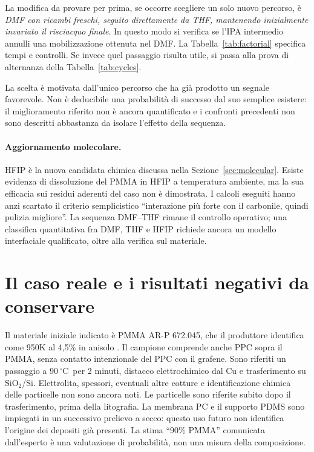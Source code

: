 \documentclass[11pt,reqno]{amsart}
\numberwithin{equation}{section}
\newcommand{\SiO}{\ensuremath{\mathrm{SiO}_2}}
\newcommand{\degC}{\ensuremath{^{\circ}\mathrm{C}}}
\begin{document}
La modifica da provare per prima, se occorre scegliere un solo
nuovo percorso, \`e \emph{DMF con ricambi freschi, seguito direttamente
da THF, mantenendo inizialmente invariato il risciacquo finale}.
In questo modo si verifica se l'IPA intermedio annulli una
mobilizzazione ottenuta nel DMF. La Tabella~\ref{tab:factorial}
specifica tempi e controlli. Se invece quel passaggio risulta utile,
si passa alla prova di alternanza della Tabella~\ref{tab:cycles}.

La scelta \`e motivata dall'unico percorso che ha gi\`a prodotto un
segnale favorevole. Non \`e deducibile una probabilit\`a di successo
dal suo semplice esistere: il miglioramento riferito non \`e ancora
quantificato e i confronti precedenti non sono descritti abbastanza
da isolare l'effetto della sequenza.


\paragraph{Aggiornamento molecolare.}
HFIP \`e la nuova candidata chimica discussa nella Sezione~\ref{sec:molecular}.
Esiste evidenza di dissoluzione del PMMA in HFIP a temperatura ambiente,
ma la sua efficacia sui residui aderenti del caso non \`e dimostrata.
I calcoli eseguiti hanno anzi scartato il criterio semplicistico
``interazione pi\`u forte con il carbonile, quindi pulizia migliore''.
La sequenza DMF--THF rimane il controllo operativo; una classifica
quantitativa fra DMF, THF e HFIP richiede ancora un modello interfaciale
qualificato, oltre alla verifica sul materiale.

\section{Il caso reale e i risultati negativi da conservare}

Il materiale iniziale indicato \`e PMMA AR-P 672.045, che il produttore
identifica come 950K al 4,5\% in anisolo \cite{Allresist}. Il campione
comprende anche PPC sopra il PMMA, senza contatto intenzionale del
PPC con il grafene. Sono riferiti un passaggio a 90\,\degC\ per
2 minuti, distacco elettrochimico dal Cu e trasferimento su \SiO/Si.
Elettrolita, spessori, eventuali altre cotture e identificazione
chimica delle particelle non sono ancora noti.
Le particelle sono riferite subito dopo il trasferimento, prima della
litografia. La membrana PC e il supporto PDMS sono impiegati in un
successivo prelievo a secco: questo uso futuro non identifica l'origine
dei depositi gi\`a presenti. La stima ``90\% PMMA'' comunicata dall'esperto
\`e una valutazione di probabilit\`a, non una misura della composizione.
\end{document}
